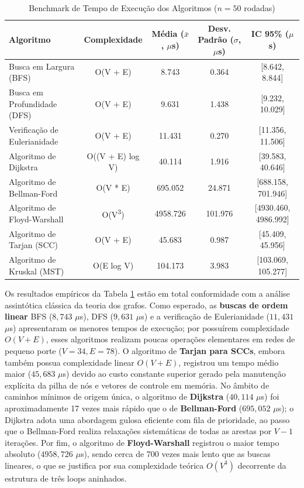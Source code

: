 \documentclass[sigconf,nonacm]{webmedia}
\begin{document}
\begin{table}[t]
  \centering
  \caption{Benchmark de Tempo de Execução dos Algoritmos ($n = 50$ rodadas)}
  \label{tab:benchmark}
  \setlength{\tabcolsep}{4pt} 
  \small 
  \begin{tabular}{lcccc}
    \toprule
    Algoritmo & Complexidade & Média ($\bar{x}$, $\mu$s) & Desv. Padrão ($\sigma$, $\mu$s) & IC 95\% ($\mu$s) \\
    \midrule
    Busca em Largura (BFS) & O(V + E) & 8.743 & 0.364 & [8.642, 8.844] \\
    Busca em Profundidade (DFS) & O(V + E) & 9.631 & 1.438 & [9.232, 10.029] \\
    Verificação de Eulerianidade & O(V + E) & 11.431 & 0.270 & [11.356, 11.506] \\
    Algoritmo de Dijkstra & O((V + E) log V) & 40.114 & 1.916 & [39.583, 40.646] \\
    Algoritmo de Bellman-Ford & O(V * E) & 695.052 & 24.871 & [688.158, 701.946] \\
    Algoritmo de Floyd-Warshall & O(V\textsuperscript{3}) & 4958.726 & 101.976 & [4930.460, 4986.992] \\
    Algoritmo de Tarjan (SCC) & O(V + E) & 45.683 & 0.987 & [45.409, 45.956] \\
    Algoritmo de Kruskal (MST) & O(E log V) & 104.173 & 3.983 & [103.069, 105.277] \\
    \bottomrule
  \end{tabular}
\end{table}

Os resultados empíricos da Tabela \ref{tab:benchmark} estão em total conformidade com a análise assintótica clássica da teoria dos grafos. Como esperado, as \textbf{buscas de ordem linear} BFS ($8,743$ $\mu$s), DFS ($9,631$ $\mu$s) e a verificação de Eulerianidade ($11,431$ $\mu$s) apresentaram os menores tempos de execução; por possuírem complexidade $O(V + E)$, esses algoritmos realizam poucas operações elementares em redes de pequeno porte ($V=34, E=78$). O algoritmo de \textbf{Tarjan para SCCs}, embora também possua complexidade linear $O(V + E)$, registrou um tempo médio maior ($45,683$ $\mu$s) devido ao custo constante superior gerado pela manutenção explícita da pilha de nós e vetores de controle em memória. No âmbito de caminhos mínimos de origem única, o algoritmo de \textbf{Dijkstra} ($40,114$ $\mu$s) foi aproximadamente 17 vezes mais rápido que o de \textbf{Bellman-Ford} ($695,052$ $\mu$s); o Dijkstra adota uma abordagem gulosa eficiente com fila de prioridade, ao passo que o Bellman-Ford realiza relaxações sistemáticas de todas as arestas por $V-1$ iterações. Por fim, o algoritmo de \textbf{Floyd-Warshall} registrou o maior tempo absoluto ($4958,726$ $\mu$s), sendo cerca de 700 vezes mais lento que as buscas lineares, o que se justifica por sua complexidade teórica $O(V^3)$ decorrente da estrutura de três loops aninhados.
\end{document}
